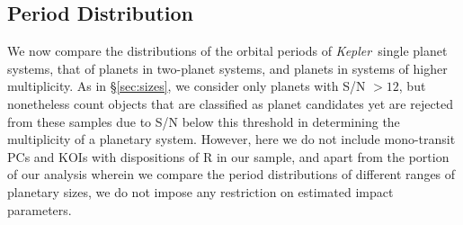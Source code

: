 \documentclass{aastex62}
\newcommand{\ik}{{\it Kepler~}}
\begin{document}


\subsection{Period Distribution} \label{sec:periodDist}

We now compare the distributions of the orbital periods of \ik single planet systems, that of planets in two-planet systems, and planets in systems of higher multiplicity.  As in  \S\ref{sec:sizes}, we consider only planets with S/N $> 12$, but nonetheless count objects that are classified as planet candidates yet are rejected from these samples due to S/N below this threshold in determining the multiplicity of a planetary system.  However, here we do not include mono-transit PCs and KOIs with dispositions of R in our sample,  and apart from the portion of our analysis wherein we compare the period distributions of different ranges of planetary sizes, we do not impose any restriction on estimated impact parameters.
\end{document}
